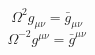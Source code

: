 \documentclass[10pt,letterpaper]{article}
\begin{document}
\[
	\Omega^2 g_{\mu\nu} = \bar g_{\mu\nu}
\]
\[
	 \Omega^{-2} g^{\mu\nu}=\bar g^{\mu\nu} 
\]
\end{document}
